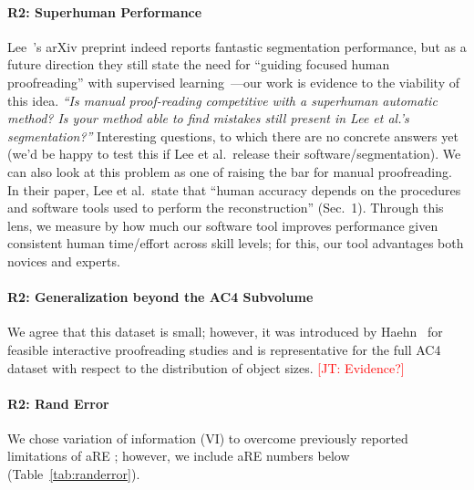\documentclass[10pt,twocolumn,letterpaper]{article}
\newcommand{\JT}[1]{\textcolor{red}{[JT: #1]}}
\begin{document}
\paragraph{R2: Superhuman Performance} Lee~\etal's arXiv preprint indeed reports fantastic segmentation performance, but as a future direction they still state the need for ``guiding focused human proofreading'' with supervised learning~\cite[Sec.~8.2]{superhuman_performance}---our work is evidence to the viability of this idea. \newline \noindent \emph{``Is manual proof-reading competitive with a superhuman automatic method? Is your method able to find mistakes still present in Lee et al.'s segmentation?''} Interesting questions, to which there are no concrete answers yet (we'd be happy to test this if Lee et al.~release their software/segmentation). We can also look at this problem as one of raising the bar for manual proofreading. In their paper, Lee et al.~state that ``human accuracy depends on the procedures and software tools used to perform the reconstruction'' (Sec.~1). Through this lens, we measure by how much our software tool improves performance given consistent human time/effort across skill levels; for this, our tool advantages both novices and experts.


\paragraph{R2: Generalization beyond the AC4 Subvolume} We agree that this dataset is small; however, it was introduced by Haehn~ for feasible interactive proofreading studies and is representative for the full AC4 dataset with respect to the distribution of object sizes. \JT{Evidence?}

\paragraph{R2: Rand Error} We chose variation of information (VI) to overcome previously reported limitations of aRE \cite[p.~5]{NunezIglesias2013Machine}; however, we include aRE numbers below (Table~\ref{tab:randerror}).
\end{document}
